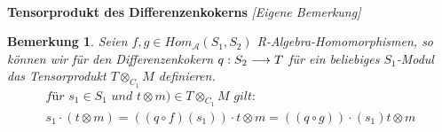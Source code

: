 \documentclass[10pt,a4paper]{report}
\newcommand{\comment}[1]{}
\newcounter{Aussage}[chapter]
\newtheorem{bem}[Aussage]{Bemerkung}
\newcommand{\functionfront}[3]{\nolinebreak{#1:#2 \longrightarrow #3}}
\newcommand{\Tensor}[3]{#1 \otimes_{#2} #3}
\newcommand{\tensor}[3]{#1 \otimes #3}
\begin{document}
\ \\
\textbf{Tensorprodukt des Differenzenkokerns} \textit{[Eigene Bemerkung]}
\begin{bem} \comment{\label{Tensorprodukt des Differenzenkokerns}}
Seien $f,g \in Hom_{\mathcal{A}}(S_1,S_2)$ R-Algebra-Homomorphismen, so können wir für den Differenzenkokern $\functionfront{q}{S_2}{T}$ für ein beliebiges $S_1$-Modul das Tensorprodukt $\Tensor{T}{C_1}{M}$ definieren. 
\begin{gather*}
\textit{für } s_1 \in S_1 \textit{ und } \tensor{t}{S_1}{m}) \in \Tensor{T}{C_1}{M} \textit{ gilt: }\\
s_1 \cdot (\tensor{t}{S_1}{m}) = \tensor{((q \circ f)(s_1)) \cdot t}{S_1}{m} = \tensor{((q \circ g)) \cdot (s_1)t}{S_1}{m}
\end{gather*}
\end{bem}
\end{document}
